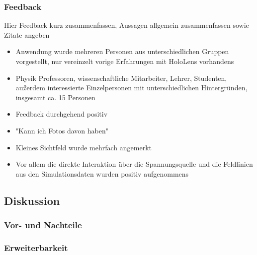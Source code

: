 \subsubsection{Feedback}
Hier Feedback kurz zusammenfassen, Aussagen allgemein zusammenfassen sowie Zitate angeben
\begin{itemize}
	\item Anwendung wurde mehreren Personen aus unterschiedlichen Gruppen vorgestellt, nur vereinzelt vorige Erfahrungen mit HoloLens vorhandens
	\item Physik Professoren, wissenschaftliche Mitarbeiter, Lehrer, Studenten, außerdem interessierte Einzelpersonen mit unterschiedlichen Hintergründen, insgesamt ca. 15 Personen
	\item Feedback durchgehend positiv
	\item "Kann ich Fotos davon haben"
	\item Kleines Sichtfeld wurde mehrfach angemerkt
	\item Vor allem die direkte Interaktion über die Spannungsquelle und die Feldlinien aus den Simulationsdaten wurden positiv aufgenommens
\end{itemize}


\subsection{Diskussion}

\subsubsection{Vor- und Nachteile}
\subsubsection{Erweiterbarkeit}
